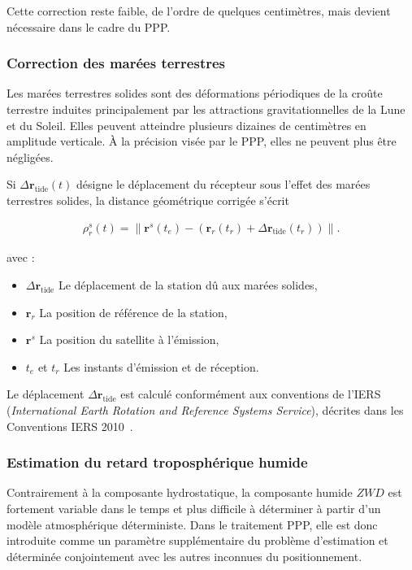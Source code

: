 Cette correction reste faible, de l'ordre de quelques centimètres, mais devient nécessaire dans le cadre du PPP.

\subsubsection{Correction des marées terrestres}\label{marees}

Les marées terrestres solides sont des déformations périodiques de la croûte
terrestre induites principalement par les attractions gravitationnelles de la
Lune et du Soleil. Elles peuvent atteindre plusieurs dizaines de centimètres
en amplitude verticale. À la précision visée par le PPP, elles ne peuvent plus
être négligées.

Si $\Delta\mathbf r_{\mathrm{tide}}(t)$ désigne le déplacement du récepteur
sous l'effet des marées terrestres solides, la distance géométrique corrigée
s'écrit

\begin{align}
\rho_r^s(t)
=
\left\|
\mathbf r^s(t_e)
-\left(\mathbf r_r(t_r)
+\Delta\mathbf r_{\mathrm{tide}}(t_r)\right)
\right\|.
\label{eq:solid_tides_geometry}
\end{align}

avec :
\begin{itemize}
    \item $\Delta\mathbf r_{\mathrm{tide}}$ Le déplacement de la station dû aux
    marées solides,
    \item $\mathbf r_r$ La position de référence de la station,
    \item $\mathbf r^s$ La position du satellite à l'émission,
    \item $t_e$ et $t_r$ Les instants d'émission et de réception.
\end{itemize}


Le déplacement $\Delta\mathbf r_{\mathrm{tide}}$ est calculé conformément
aux conventions de l'IERS (\textit{International Earth Rotation and Reference
Systems Service}), décrites dans les Conventions IERS 2010~\cite{iers2010}.

\subsubsection{Estimation du retard troposphérique humide}

Contrairement à la composante hydrostatique, la composante humide $ZWD$ est fortement variable dans le temps
et plus difficile à déterminer à partir d'un modèle atmosphérique
déterministe. Dans le traitement PPP, elle est donc introduite comme un paramètre supplémentaire du
problème d'estimation et déterminée conjointement avec les autres inconnues
du positionnement.

